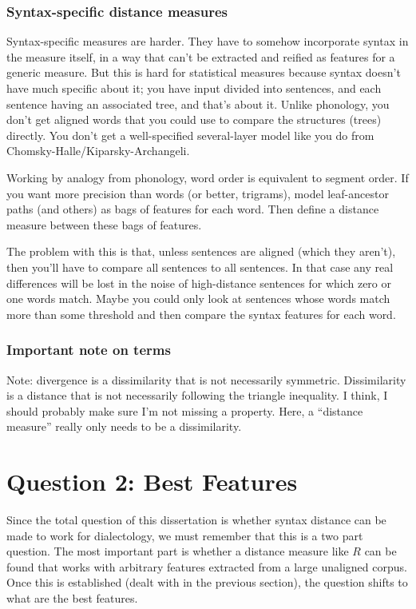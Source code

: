 \subsubsection{Syntax-specific distance measures}

Syntax-specific measures are harder. They have to somehow incorporate
syntax in the measure itself, in a way that can't be extracted and
reified as features for a generic measure. But this is hard for
statistical measures because syntax doesn't have much specific about
it; you have input divided into sentences, and each sentence having an
associated tree, and that's about it. Unlike phonology, you don't get
aligned words that you could use to compare the structures (trees)
directly. You don't get a well-specified several-layer model like you
do from Chomsky-Halle/Kiparsky-Archangeli.

Working by analogy from phonology, word order is equivalent to segment
order. If you want more precision than words (or better, trigrams),
model leaf-ancestor paths (and others) as bags of features for each
word. Then define a distance measure between these bags of features.

The problem with this is that, unless sentences are aligned (which
they aren't), then you'll have to compare all sentences to all
sentences. In that case any real differences will be lost in the noise
of high-distance sentences for which zero or one words match. Maybe
you could only look at sentences whose words match more than some
threshold and then compare the syntax features for each word.

\subsubsection{Important note on terms}

Note: divergence is a dissimilarity that is not necessarily
symmetric. Dissimilarity is a distance that is not necessarily
following the triangle inequality. I think, I should probably make
sure I'm not missing a property. Here, a ``distance measure'' really
only needs to be a dissimilarity.

\section{Question 2: Best Features}

Since the total question of this dissertation is whether syntax
distance can be made to work for dialectology, we must remember that
this is a two part question. The most important part is whether a
distance measure like $R$ can be found that works with arbitrary
features extracted from a large unaligned corpus. Once this is
established (dealt with in the previous section), the question shifts to what are
the best features.

